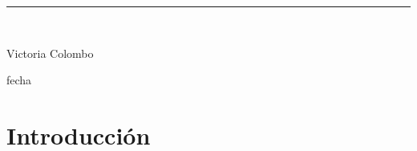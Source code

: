 \documentclass[10 pt]{article}
\begin{document}
\begin{titlepage}
\begin{center}
    
    \vspace*{0.3in}
    \rule{80mm}{0.1mm}\\
    \vspace*{0.1in}
    \begin{large}
    Victoria Colombo
    
    \vspace*{0.3in}
    
    \vspace*{0.1in}fecha
    \end{large}
    \end{center}
    
    \end{titlepage}

\newpage

\begin{abstract}

\end{abstract}
\newpage
\section*{Introducción}\label{intro}
\end{document}
